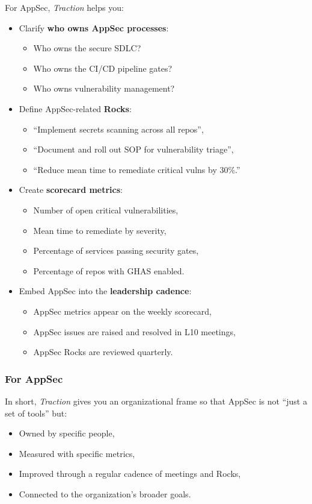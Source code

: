 \documentclass[11pt]{article}
\begin{document}
For AppSec, \emph{Traction} helps you:
\begin{itemize}
  \item Clarify \textbf{who owns AppSec processes}:
        \begin{itemize}
          \item Who owns the secure SDLC?
          \item Who owns the CI/CD pipeline gates?
          \item Who owns vulnerability management?
        \end{itemize}
  \item Define AppSec-related \textbf{Rocks}:
        \begin{itemize}
          \item ``Implement secrets scanning across all repos'',
          \item ``Document and roll out SOP for vulnerability triage'',
          \item ``Reduce mean time to remediate critical vulns by 30\%.''
        \end{itemize}
  \item Create \textbf{scorecard metrics}:
        \begin{itemize}
          \item Number of open critical vulnerabilities,
          \item Mean time to remediate by severity,
          \item Percentage of services passing security gates,
          \item Percentage of repos with GHAS enabled.
        \end{itemize}
  \item Embed AppSec into the \textbf{leadership cadence}:
        \begin{itemize}
          \item AppSec metrics appear on the weekly scorecard,
          \item AppSec issues are raised and resolved in L10 meetings,
          \item AppSec Rocks are reviewed quarterly.
        \end{itemize}
\end{itemize}

\subsubsection*{For AppSec}

In short, \emph{Traction} gives you an organizational frame so that
AppSec is not ``just a set of tools'' but:
\begin{itemize}
  \item Owned by specific people,
  \item Measured with specific metrics,
  \item Improved through a regular cadence of meetings and Rocks,
  \item Connected to the organization's broader goals.
\end{itemize}
\end{document}
